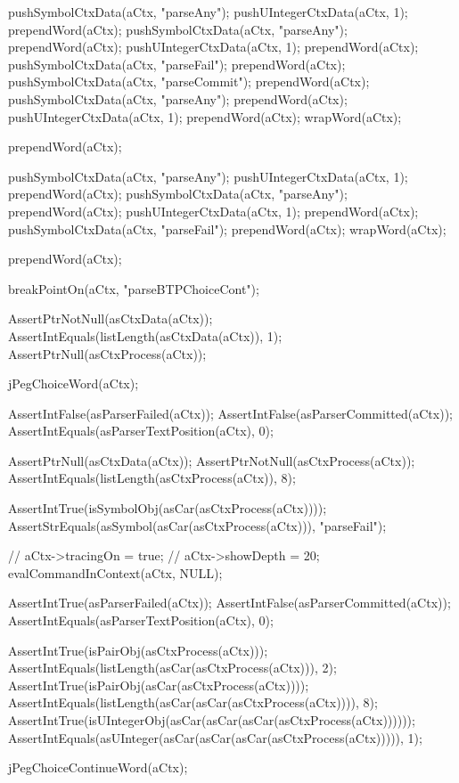   pushSymbolCtxData(aCtx, "parseAny");
  pushUIntegerCtxData(aCtx, 1);
  prependWord(aCtx);
  pushSymbolCtxData(aCtx, "parseAny");
  prependWord(aCtx);
  pushUIntegerCtxData(aCtx, 1);
  prependWord(aCtx);
  pushSymbolCtxData(aCtx, "parseFail");
  prependWord(aCtx);
  pushSymbolCtxData(aCtx, "parseCommit");
  prependWord(aCtx);
  pushSymbolCtxData(aCtx, "parseAny");
  prependWord(aCtx);
  pushUIntegerCtxData(aCtx, 1);
  prependWord(aCtx);
  wrapWord(aCtx);
  
  prependWord(aCtx);
  
  pushSymbolCtxData(aCtx, "parseAny");
  pushUIntegerCtxData(aCtx, 1);
  prependWord(aCtx);
  pushSymbolCtxData(aCtx, "parseAny");
  prependWord(aCtx);
  pushUIntegerCtxData(aCtx, 1);
  prependWord(aCtx);
  pushSymbolCtxData(aCtx, "parseFail");
  prependWord(aCtx);
  wrapWord(aCtx);
  
  prependWord(aCtx);
  
  breakPointOn(aCtx, "parseBTPChoiceCont");

  AssertPtrNotNull(asCtxData(aCtx));
  AssertIntEquals(listLength(asCtxData(aCtx)), 1);
  AssertPtrNull(asCtxProcess(aCtx));
  
  jPegChoiceWord(aCtx);
  
  AssertIntFalse(asParserFailed(aCtx));
  AssertIntFalse(asParserCommitted(aCtx));
  AssertIntEquals(asParserTextPosition(aCtx), 0);
  
  AssertPtrNull(asCtxData(aCtx));
  AssertPtrNotNull(asCtxProcess(aCtx));
  AssertIntEquals(listLength(asCtxProcess(aCtx)), 8);
  
  AssertIntTrue(isSymbolObj(asCar(asCtxProcess(aCtx))));
  AssertStrEquals(asSymbol(asCar(asCtxProcess(aCtx))), "parseFail");
  
//  aCtx->tracingOn = true;
//  aCtx->showDepth = 20;
  evalCommandInContext(aCtx, NULL);
  
  AssertIntTrue(asParserFailed(aCtx));
  AssertIntFalse(asParserCommitted(aCtx));
  AssertIntEquals(asParserTextPosition(aCtx), 0);
  
  AssertIntTrue(isPairObj(asCtxProcess(aCtx)));
  AssertIntEquals(listLength(asCar(asCtxProcess(aCtx))), 2);
  AssertIntTrue(isPairObj(asCar(asCtxProcess(aCtx))));
  AssertIntEquals(listLength(asCar(asCar(asCtxProcess(aCtx)))), 8);
  AssertIntTrue(isUIntegerObj(asCar(asCar(asCar(asCtxProcess(aCtx))))));
  AssertIntEquals(asUInteger(asCar(asCar(asCar(asCtxProcess(aCtx))))), 1);
  
  jPegChoiceContinueWord(aCtx);
  

